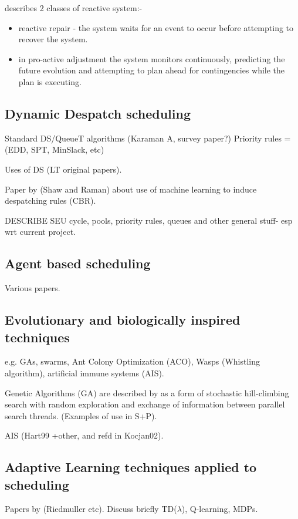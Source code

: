 \cite{jones98survey} describes 2 classes of reactive system:-
\begin{itemize}
\item reactive repair - the system waits for an event to occur before attempting to recover the system.
\item in pro-active adjustment the system monitors continuously, predicting the future evolution and attempting to plan ahead for contingencies while the plan is executing.
\end{itemize}

\subsection{Dynamic Despatch scheduling}
\label{sect:dynamic}
Standard DS/QueueT algorithms (Karaman A, survey paper?)  Priority rules = (EDD, SPT, MinSlack, etc)

Uses of DS (LT original papers).

Paper by (Shaw and Raman) about use of machine learning to induce despatching rules (CBR).

DESCRIBE SEU cycle, pools, priority rules, queues and other general stuff- esp wrt current project.

%
%
\subsection{Agent based scheduling}
Various papers. 

%
%
\subsection{Evolutionary and biologically inspired techniques}
e.g. GAs, swarms, Ant Colony Optimization (ACO), Wasps (Whistling algorithm), artificial immune systems (AIS).

Genetic Algorithms (GA) are described by \cite{russel03artificial} as a form of stochastic hill-climbing search with random exploration and exchange of information between parallel search threads. (Examples of use in S+P).

AIS (Hart99 +other, and refd in Kocjan02).


%
%
\subsection{Adaptive Learning techniques applied to scheduling}
Papers by (Riedmuller etc). Discuss briefly TD($\lambda$), Q-learning, MDPs.

